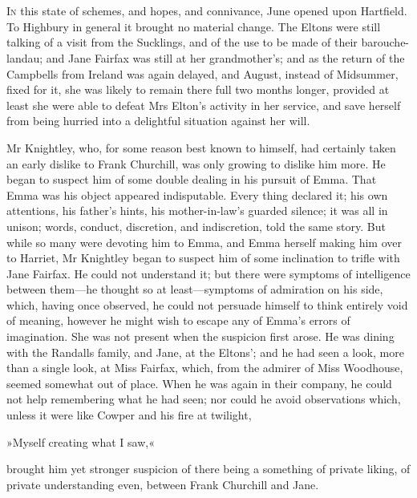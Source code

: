 \chapter[Chapter \thechapter]{}
\lettrine[lines=4,lraise=0.3]{I}{n} this state of schemes, and hopes, and connivance, June opened upon Hartfield. To Highbury in general it brought no material change. The Eltons were still talking of a visit from the Sucklings, and of the use to be made of their barouche-landau; and Jane Fairfax was still at her grandmother's; and as the return of the Campbells from Ireland was again delayed, and August, instead of Midsummer, fixed for it, she was likely to remain there full two months longer, provided at least she were able to defeat Mrs Elton's activity in her service, and save herself from being hurried into a delightful situation against her will.

Mr Knightley, who, for some reason best known to himself, had certainly taken an early dislike to Frank Churchill, was only growing to dislike him more. He began to suspect him of some double dealing in his pursuit of Emma. That Emma was his object appeared indisputable. Every thing declared it; his own attentions, his father's hints, his mother-in-law's guarded silence; it was all in unison; words, conduct, discretion, and indiscretion, told the same story. But while so many were devoting him to Emma, and Emma herself making him over to Harriet, Mr Knightley began to suspect him of some inclination to trifle with Jane Fairfax. He could not understand it; but there were symptoms of intelligence between them—he thought so at least—symptoms of admiration on his side, which, having once observed, he could not persuade himself to think entirely void of meaning, however he might wish to escape any of Emma's errors of imagination. She was not present when the suspicion first arose. He was dining with the Randalls family, and Jane, at the Eltons'; and he had seen a look, more than a single look, at Miss Fairfax, which, from the admirer of Miss Woodhouse, seemed somewhat out of place. When he was again in their company, he could not help remembering what he had seen; nor could he avoid observations which, unless it were like Cowper and his fire at twilight,

»Myself creating what I saw,«

brought him yet stronger suspicion of there being a something of private liking, of private understanding even, between Frank Churchill and Jane.

